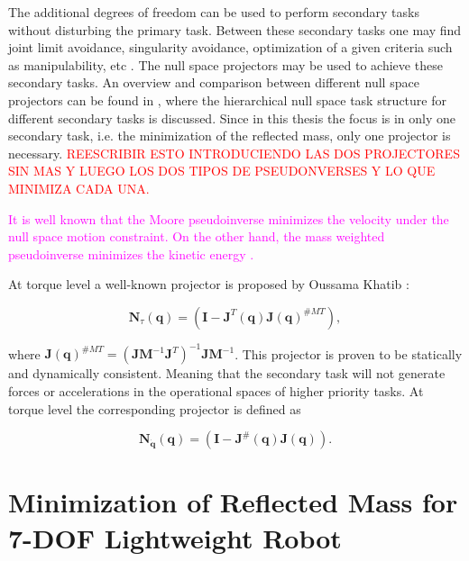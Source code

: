 The additional degrees of freedom can be used to perform secondary tasks without disturbing the primary task. Between these secondary tasks one may find joint limit avoidance, singularity avoidance, optimization of a given criteria such as manipulability, etc  \cite{redundancy_1}. 
The null space projectors may be used to achieve these secondary tasks. An overview and comparison between different null space projectors can be found in \cite{JLA_5}, where the hierarchical null space task structure for different secondary tasks is discussed. Since in this thesis the focus is in only one secondary task, i.e. the minimization of the reflected mass, only one projector is necessary. 
\textcolor{red}{REESCRIBIR ESTO INTRODUCIENDO LAS DOS PROJECTORES SIN MAS Y LUEGO LOS DOS TIPOS DE PSEUDONVERSES Y LO QUE MINIMIZA CADA UNA. }

\textcolor{magenta}{ It is well known that the Moore pseudoinverse minimizes the velocity under the null space motion constraint. On the other hand, the mass weighted pseudoinverse minimizes the kinetic energy \cite{khatib1995}. }

At torque level a well-known projector is proposed by Oussama Khatib \cite{khatib1995}:


\begin{equation}
	\mathbf{N}_{\tau}(\mathbf{q}) = \left(\mathbf{I}-\mathbf{J}^{T}(\mathbf{q})\mathbf{J}(\mathbf{q})^{\#MT}\right),
	\label{eq:proj_tau_khatib}
\end{equation}

where $\mathbf{J}(\mathbf{q})^{\#MT} = (\mathbf{J}\mathbf{ M}^{-1} \mathbf{J}^T)^{-1} \mathbf{J} \mathbf{M}^{-1}$. This projector is proven to be statically and dynamically consistent. Meaning that the secondary task will not generate forces or accelerations in the operational spaces of higher priority tasks.
At torque level the corresponding projector is defined as

\begin{equation}
\mathbf{N}_{\mathbf{\dot{q}}}(\mathbf{q}) = \left(\mathbf{I}-\mathbf{J}^{\#}(\mathbf{q})\mathbf{J}(\mathbf{q})\right).
\label{eq:proj_dq_khatib}
\end{equation}






\section{Minimization of Reflected Mass for 7-DOF Lightweight Robot}
\label{sec:control_LWR}

